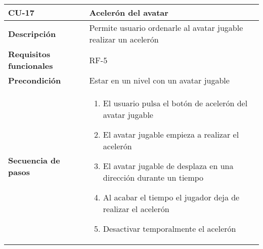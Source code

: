 \begin{tabularx}{\columnwidth}{l|l}
\begin{minipage}{0.25\columnwidth}
\textbf{CU-17} 
\end{minipage}
&
\begin{minipage}{0.65\columnwidth}
Acelerón del avatar
\end{minipage}
\\ \hline

\begin{minipage}{0.25\columnwidth}
\textbf{Descripción} 
\end{minipage}
&
\begin{minipage}{0.65\columnwidth}
Permite usuario ordenarle al avatar jugable realizar un acelerón
\end{minipage}
\\ \hline

\begin{minipage}{0.25\columnwidth}
\textbf{Requisitos funcionales} 
\end{minipage}
&
\begin{minipage}{0.65\columnwidth}
RF-5
\end{minipage}
\\ \hline

\begin{minipage}{0.25\columnwidth}
\textbf{Precondición} 
\end{minipage}
&
\begin{minipage}{0.65\columnwidth}
Estar en un nivel con un avatar jugable
\end{minipage}
\\ \hline

\begin{minipage}{0.25\columnwidth}
\textbf{Secuencia de pasos} 
\end{minipage}
&
\begin{minipage}{0.65\columnwidth}
\begin{enumerate}
\item
El usuario pulsa el botón de acelerón del avatar jugable
\item
El avatar jugable empieza a realizar el acelerón
\item
El avatar jugable de desplaza en una dirección durante un tiempo
\item
Al acabar el tiempo el jugador deja de realizar el acelerón
\item
Desactivar temporalmente el acelerón
\end{enumerate}
\end{minipage}
\\ \hline


\end{tabularx}
